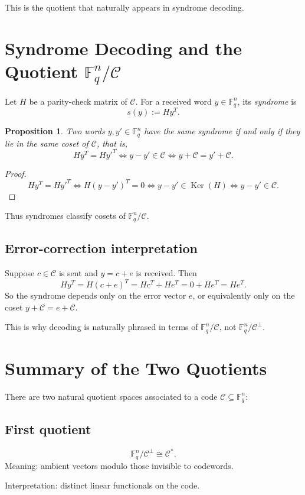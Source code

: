 \documentclass[11pt]{article}
\newtheorem{proposition}{Proposition}
\theoremstyle{remark}
\newcommand{\F}{\mathbb{F}}
\newcommand{\C}{\mathcal{C}}
\newcommand{\Cp}{\mathcal{C}^{\perp}}
\newcommand{\Ker}{\operatorname{Ker}}
\begin{document}
	This is the quotient that naturally appears in syndrome decoding.
	
	\section{Syndrome Decoding and the Quotient \(\F_q^n/\C\)}
	
	Let \(H\) be a parity-check matrix of \(\C\). For a received word \(y\in \F_q^n\), its \emph{syndrome} is
	\[
	s(y):=Hy^T.
	\]
	
	\begin{proposition}
		Two words \(y,y'\in \F_q^n\) have the same syndrome if and only if they lie in the same coset of \(\C\), that is,
		\[
		Hy^T=Hy'^T
		\iff y-y'\in \C
		\iff y+\C=y'+\C.
		\]
	\end{proposition}
	
	\begin{proof}
		\[
		Hy^T=Hy'^T
		\iff H(y-y')^T=0
		\iff y-y'\in \Ker(H)
		\iff y-y'\in \C.
		\]
	\end{proof}
	
	Thus syndromes classify cosets of \(\F_q^n/\C\).
	
	\subsection{Error-correction interpretation}
	
	Suppose \(c\in \C\) is sent and \(y=c+e\) is received. Then
	\[
	Hy^T = H(c+e)^T = Hc^T + He^T = 0 + He^T = He^T.
	\]
	So the syndrome depends only on the error vector \(e\), or equivalently only on the coset \(y+\C=e+\C\).
	
	This is why decoding is naturally phrased in terms of \(\F_q^n/\C\), not \(\F_q^n/\Cp\).
	
	\section{Summary of the Two Quotients}
	
	There are two natural quotient spaces associated to a code \(\C\subseteq \F_q^n\):
	
	\subsection*{First quotient}
	\[
	\F_q^n/\Cp \cong \C^*.
	\]
	Meaning: ambient vectors modulo those invisible to codewords.
	
	Interpretation: distinct linear functionals on the code.
	
\end{document}
